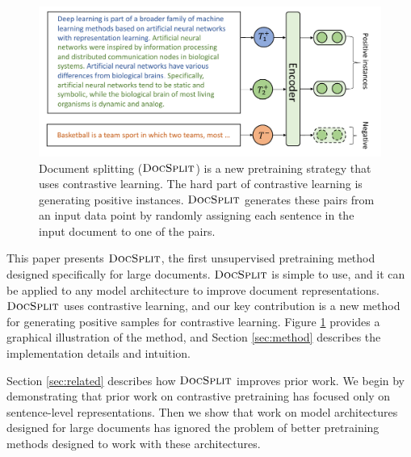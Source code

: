 \documentclass[11pt]{article}
\newcommand{\our}{\mbox{\textsc{DocSplit}}}
\begin{document}
\begin{figure}
    \includegraphics[width=\columnwidth]{fig/docsplit.pdf}
\caption{
    Document splitting ($\our$) is a new pretraining strategy that uses contrastive learning.
    The hard part of contrastive learning is generating positive instances.
    $\our$ generates these pairs from an input data point by randomly assigning each sentence in the input document to one of the pairs.
}
\label{overall}
\end{figure}

This paper presents $\our$, the first unsupervised pretraining method designed specifically for large documents.
$\our$ is simple to use,
and it can be applied to any model architecture to improve document representations. 
$\our$ uses contrastive learning,
and our key contribution is a new method for generating positive samples for contrastive learning.
Figure \ref{overall} provides a graphical illustration of the method,
and Section \ref{sec:method} describes the implementation details and intuition.

Section \ref{sec:related} describes how $\our$ improves prior work.
We begin by demonstrating that prior work on contrastive pretraining has focused only on sentence-level representations.
Then we show that work on model architectures designed for large documents has ignored the problem of better pretraining methods designed to work with these architectures.

\end{document}
